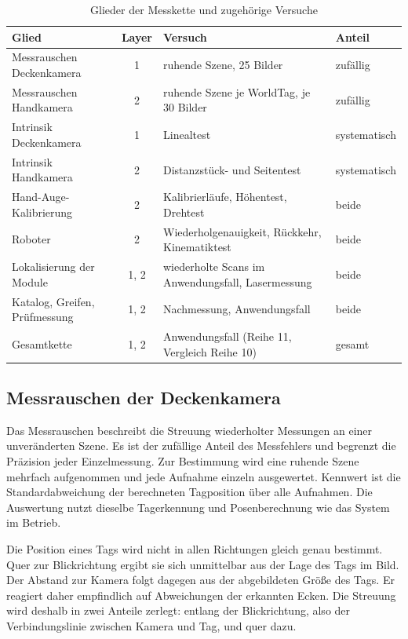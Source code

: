 \begin{table}[htbp]
    \centering
    \caption{Glieder der Messkette und zugehörige Versuche}
    \label{tab:auswertekette}
    \begin{tabularx}{\textwidth}{@{}l c X l@{}}
        \toprule
        Glied & Layer & Versuch & Anteil \\
        \midrule
        Messrauschen Deckenkamera & 1 & ruhende Szene, 25 Bilder & zufällig \\
        Messrauschen Handkamera & 2 & ruhende Szene je WorldTag, je 30 Bilder & zufällig \\
        Intrinsik Deckenkamera & 1 & Linealtest & systematisch \\
        Intrinsik Handkamera & 2 & Distanzstück- und Seitentest & systematisch \\
        Hand-Auge-Kalibrierung & 2 & Kalibrierläufe, Höhentest, Drehtest & beide \\
        Roboter & 2 & Wiederholgenauigkeit, Rückkehr, Kinematiktest & beide \\
        Lokalisierung der Module & 1, 2 & wiederholte Scans im Anwendungsfall, Lasermessung & beide \\
        Katalog, Greifen, Prüfmessung & 1, 2 & Nachmessung, Anwendungsfall & beide \\
        Gesamtkette & 1, 2 & Anwendungsfall (Reihe 11, Vergleich Reihe 10) & gesamt \\
        \bottomrule
    \end{tabularx}
\end{table}

\subsection{Messrauschen der Deckenkamera}
\label{subsec:Messrauschen_Decke}

Das Messrauschen beschreibt die Streuung wiederholter Messungen an einer unveränderten Szene. Es ist der zufällige Anteil des Messfehlers und begrenzt die Präzision jeder Einzelmessung. Zur Bestimmung wird eine ruhende Szene mehrfach aufgenommen und jede Aufnahme einzeln ausgewertet. Kennwert ist die Standardabweichung der berechneten Tagposition über alle Aufnahmen. Die Auswertung nutzt dieselbe Tagerkennung und Posenberechnung wie das System im Betrieb.

Die Position eines Tags wird nicht in allen Richtungen gleich genau bestimmt. Quer zur Blickrichtung ergibt sie sich unmittelbar aus der Lage des Tags im Bild. Der Abstand zur Kamera folgt dagegen aus der abgebildeten Größe des Tags. Er reagiert daher empfindlich auf Abweichungen der erkannten Ecken. Die Streuung wird deshalb in zwei Anteile zerlegt: entlang der Blickrichtung, also der Verbindungslinie zwischen Kamera und Tag, und quer dazu.

